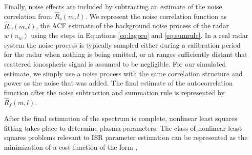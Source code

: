 




Finally, noise effects are included by subtracting an estimate of the noise correlation from $\widehat{R}_s(m,l)$.  We represent the noise correlation function as $\widehat{R}_w(m,l)$, the ACF estimate of the background noise process of the radar $w(n_w)$ using the steps in Equations \ref{eq:lagpro} and \ref{eq:sumrule}. In a real radar system the noise process is typically sampled either during a calibration period for the radar when nothing is being emitted, or at ranges sufficiently distant that scattered ionospheric signal is assumed to be negligible. For our simulated estimate, we simply use a noise process with the same correlation structure and power as the noise that was added. The final estimate of the autocorrelation function after the noise subtraction and summation rule is represented by $\widehat{R}_f(m,l)$.


After the final estimation of the spectrum is complete, nonlinear least squares fitting takes place to determine plasma parameters.  
The class of nonlinear least squares problems relevant to ISR parameter estimation can be represented as the minimization of a cost function of the form \cite{kayvol1},

